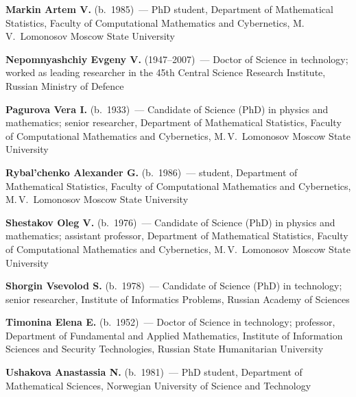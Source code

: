 \begin{multicols}{2}
{}

\vspace*{6pt}

\noindent
\textbf{Markin Artem V.} (b.\ 1985)~--- PhD student, Department of Mathematical 
Statistics, Faculty of Computational Mathematics and Cybernetics, M.\,V.~Lomonosov Moscow State University

\vspace*{6pt}

\noindent
\textbf{Nepomnyashchiy Evgeny V.} (1947--2007)~--- Doctor of Science in 
technology; worked as leading researcher in the 45th Central Science Research Institute, Russian  
Ministry of Defence

\noindent
\textbf{Pagurova Vera I.} (b.\ 1933)~--- Candidate of Science (PhD) in physics and 
mathematics; senior researcher, Department of Mathematical Statistics, Faculty of 
Computational Mathematics and Cybernetics, M.\,V.~Lomonosov Moscow State University

\vspace*{6pt}

\noindent
\textbf{Rybal'chenko Alexander G.} (b.\ 1986)~--- student, Department of 
Mathematical Statistics, Faculty of Computational Mathematics and Cybernetics, M.\,V.~Lomonosov Moscow State 
University

\vspace*{6pt}

\noindent
\textbf{Shestakov Oleg V.} (b.\ 1976)~--- Candidate of Science (PhD) in 
physics and mathematics; assistant professor, Department of Mathematical Statistics, Faculty of 
Computational Mathematics and Cybernetics, M.\,V.~Lomonosov Moscow State University

\vspace*{6pt}

\noindent
\textbf{Shorgin Vsevolod S.} (b.\ 1978)~--- Candidate of Science (PhD) in 
technology; senior researcher, Institute of Informatics Problems, Russian Academy of Sciences

\vspace*{6pt}

\noindent
\textbf{Timonina Elena E.} (b.\ 1952)~--- Doctor of Science in technology;
professor, Department of Fundamental and Applied Mathematics, Institute of Information 
Sciences and Security Technologies, Russian State Humanitarian University

\vspace*{6pt}

\noindent
\textbf{Ushakova Anastassia N.} (b.\ 1981)~--- PhD student, Department of 
Mathematical Sciences, Norwegian University of Science and Technology


\end{multicols}
